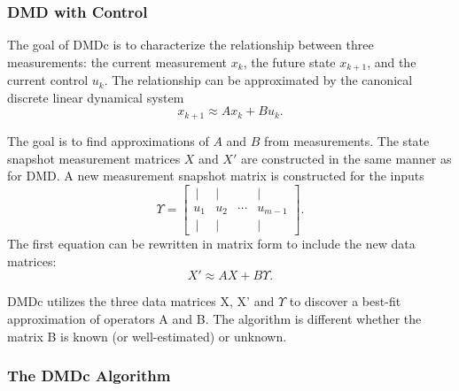 \documentclass{article}
\begin{document}
\vspace{1cm}

\vspace{1cm}

\subsubsection*{DMD with Control}

\vspace{1cm}

The goal of DMDc is to characterize the relationship between three measurements:
the current measurement $x_k$, the future state $x_{k+1}$, and the current control
$u_k$. The relationship can be approximated by the canonical discrete linear
dynamical system
\[
    x_{k+1} \approx A x_k + B u_k.
\]

The goal is to find approximations of $A$ and $B$ from measurements. 
The state snapshot measurement matrices $X$ and $X'$ are constructed in the same
manner as for DMD. A new measurement snapshot matrix is constructed for the inputs
\[
    \Upsilon =
    \begin{bmatrix}
        \,| & | &  & |\, \\
        u_1 & u_2 & \cdots & u_{m-1} \\
        \,| & | &  & |\, 
    \end{bmatrix}.
\]
The first equation can be rewritten in matrix form to include the new data matrices:
\[
    X' \approx A X + B \Upsilon.
\]

DMDc utilizes the three data matrices X, X' and $ \Upsilon $ to discover a best-fit approximation of operators A and B. The algorithm is different whether the matrix B is known (or well-estimated) or unknown.

\vspace{1cm}

\subsubsection*{The DMDc Algorithm}

\vspace{1cm}
\end{document}
